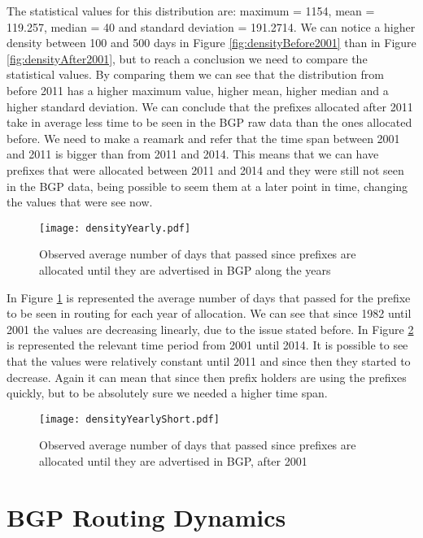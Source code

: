 \documentclass[11pt,a4paper]{scrreprt}
\begin{document}
The statistical values for this distribution are: maximum = 1154, mean = 119.257, median = 40 and standard deviation = 191.2714. We can notice a higher density between 100 and 500 days in Figure \ref{fig:densityBefore2001} than in Figure \ref{fig:densityAfter2001}, but to reach a conclusion we need to compare the statistical values. By comparing them we can see that the distribution from before 2011 has a higher maximum value, higher mean, higher median and a higher standard deviation. We can conclude that the prefixes allocated after 2011 take in average less time to be seen in the BGP raw data than the ones allocated before. We need to make a reamark and refer that the time span between 2001 and 2011 is bigger than from 2011 and 2014. This means that we can have prefixes that were allocated between 2011 and 2014 and they were still not seen in the BGP data, being possible to seem them at a later point in time, changing the values that were see now.

\begin{figure}[!h]
\centering
\texttt{[image: densityYearly.pdf]}
\caption{Observed average number of days that passed since prefixes are allocated until they are advertised in BGP along the years}
\label{fig:densityYearly}
\end{figure}

In Figure \ref{fig:densityYearly} is represented the average number of days that passed for the prefixe to be seen in routing for each year of allocation. We can see that since 1982 until 2001 the values are decreasing linearly, due to the issue stated before. In  Figure \ref{fig:densityYearlyShort} is represented the relevant time period from 2001 until 2014. It is possible to see that the values were relatively constant until 2011 and since then they started to decrease. Again it can mean that since then prefix holders are using the prefixes quickly, but to be absolutely sure we needed a higher time span.


\begin{figure}[!h]
\centering
\texttt{[image: densityYearlyShort.pdf]}
\caption{Observed average number of days that passed since prefixes are allocated until they are advertised in BGP, after 2001}
\label{fig:densityYearlyShort}
\end{figure}

\section{BGP Routing Dynamics}
\end{document}
